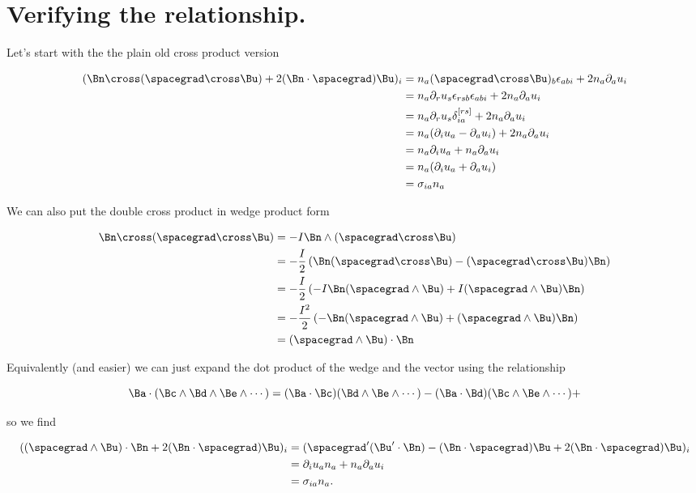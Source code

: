 \section{Verifying the relationship.}

Let's start with the the plain old cross product version

\begin{align*}
(\Bn \cross (\spacegrad \cross \Bu) + 2 (\Bn \cdot \spacegrad) \Bu)_i
&=
n_a (\spacegrad \cross \Bu)_b \epsilon_{a b i}  + 2 n_a \partial_a u_i \\
&=
n_a \partial_r u_s \epsilon_{r s b} \epsilon_{a b i}  + 2 n_a \partial_a u_i \\
&=
n_a \partial_r u_s \delta_{ia}^{[rs]} + 2 n_a \partial_a u_i \\
&=
n_a ( \partial_i u_a -\partial_a u_i ) + 2 n_a \partial_a u_i \\
&=
n_a \partial_i u_a + n_a \partial_a u_i \\
&=
n_a (\partial_i u_a + \partial_a u_i) \\
&=
\sigma_{i a } n_a 
\end{align*}

We can also put the double cross product in wedge product form

\begin{align*}
\Bn \cross (\spacegrad \cross \Bu)
&=
-I \Bn \wedge (\spacegrad \cross \Bu) \\
&=
-\frac{I}{2} 
\left(
\Bn (\spacegrad \cross \Bu) 
- (\spacegrad \cross \Bu) \Bn
\right) \\
&=
-\frac{I}{2} 
\left(
-I \Bn (\spacegrad \wedge \Bu) 
+ I (\spacegrad \wedge \Bu) \Bn
\right) \\
&=
-\frac{I^2}{2} 
\left(
- \Bn (\spacegrad \wedge \Bu) 
+ (\spacegrad \wedge \Bu) \Bn
\right) \\
&=
(\spacegrad \wedge \Bu) \cdot \Bn
\end{align*}

Equivalently (and easier) we can just expand the dot product of the wedge and the vector using the relationship

\begin{equation}\label{eqn:stressTensorVectorForm:n}
\Ba \cdot (\Bc \wedge \Bd \wedge \Be \wedge \cdots )
=
(\Ba \cdot \Bc) (\Bd \wedge \Be \wedge \cdots ) - (\Ba \cdot \Bd) (\Bc \wedge \Be \wedge \cdots ) +
\end{equation}

so we find

\begin{align*}
((\spacegrad \wedge \Bu) \cdot \Bn + 2 (\Bn \cdot \spacegrad) \Bu
)_i
&=
(
\spacegrad' (\Bu' \cdot \Bn)
-
(\Bn \cdot \spacegrad) \Bu
+ 2 (\Bn \cdot \spacegrad) \Bu
)_i \\
&=
\partial_i u_a n_a
+
n_a \partial_a u_i \\
&=
\sigma_{ia} n_a.
\end{align*}

\EndArticle
